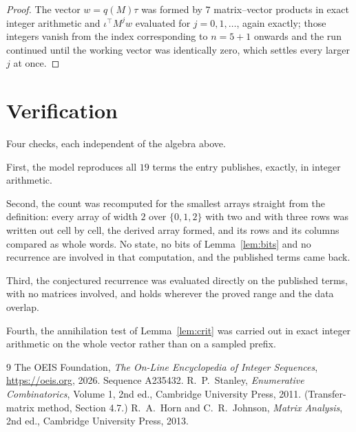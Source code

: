 \documentclass[11pt,a4paper]{article}
\theoremstyle{plain}
\theoremstyle{definition}
\begin{document}
\begin{proof}
The vector $w=q(M)\tau$ was formed by $7$ matrix--vector products in exact integer
arithmetic and $\iota^{\!\top}M^{j}w$ evaluated for $j=0,1,\dots$, again exactly; those
integers vanish from the index corresponding to $n=5+1$ onwards and the run continued
until the working vector was identically zero, which settles every larger $j$ at once.
\end{proof}

\section{Verification}

Four checks, each independent of the algebra above.

First, the model reproduces all $19$ terms the entry publishes, exactly, in integer
arithmetic.

Second, the count was recomputed for the smallest arrays straight from the definition: every
array of width $2$ over $\{0,1,2\}$ with two and with three rows was written out cell by cell,
the derived array formed, and its rows and its columns compared as whole words. No state, no
bits of Lemma~\ref{lem:bits} and no recurrence are involved in that computation, and the
published terms came back.

Third, the conjectured recurrence was evaluated directly on the published terms, with no
matrices involved, and holds wherever the proved range and the data overlap.

Fourth, the annihilation test of Lemma~\ref{lem:crit} was carried out in exact integer
arithmetic on the whole vector rather than on a sampled prefix.

\begin{thebibliography}{9}
 The OEIS Foundation, \emph{The On-Line Encyclopedia of Integer
Sequences}, \url{https://oeis.org}, 2026. Sequence A235432.
 R.~P.~Stanley, \emph{Enumerative Combinatorics}, Volume 1, 2nd ed.,
Cambridge University Press, 2011. (Transfer-matrix method, Section 4.7.)
 R.~A.~Horn and C.~R.~Johnson, \emph{Matrix Analysis}, 2nd ed., Cambridge
University Press, 2013.
\end{thebibliography}
\end{document}
